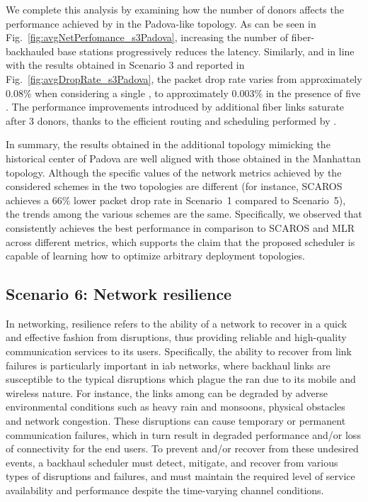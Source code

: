 We complete this analysis by examining how the number of donors affects the performance achieved by \name{} in the Padova-like topology. 
As can be seen in Fig.~\ref{fig:avgNetPerfomance_s3Padova}, increasing the number of fiber-backhauled base stations progressively reduces the latency. Similarly, and in line with the results obtained in Scenario 3 and reported in Fig.~\ref{fig:avgDropRate_s3Padova}, the packet drop rate varies from approximately 0.08\% when considering a single \donor{}, to approximately 0.003\% in the presence of five \donors{}. The performance improvements introduced by additional fiber links saturate after 3 donors, thanks to the efficient routing and scheduling performed by \name{}.

In summary, the results obtained in the additional topology mimicking the historical center of Padova are well aligned with those obtained in the Manhattan topology. Although the specific values of the network metrics achieved by the considered schemes in the two topologies are different (for instance, SCAROS achieves a 66\% lower packet drop rate in Scenario~1 compared to Scenario~5), the trends among the various schemes are the same. Specifically, we observed that \name{} consistently achieves the best performance in comparison to SCAROS and MLR across different metrics, which supports the claim that the proposed scheduler is capable of learning how to optimize arbitrary deployment topologies.

\subsection{Scenario 6: Network resilience}
In networking, resilience refers to the ability of a network to recover in a quick and effective fashion from disruptions, thus providing reliable and high-quality communication services to its users.
Specifically, the ability to recover from link failures is particularly important in \gls{iab} networks, where backhaul links are susceptible to the typical disruptions which plague the \gls{ran} due to its mobile and wireless nature. For instance, the links among \nodes{} can be degraded by adverse environmental conditions such as heavy rain and monsoons, physical obstacles and network congestion. These disruptions can cause temporary or permanent communication failures, which in turn result in degraded performance and/or loss of connectivity for the end users. 
To prevent and/or recover from these undesired events, a backhaul scheduler must detect, mitigate, and recover from various types of disruptions and failures, and must maintain the required level of service availability and performance despite the time-varying channel conditions.

